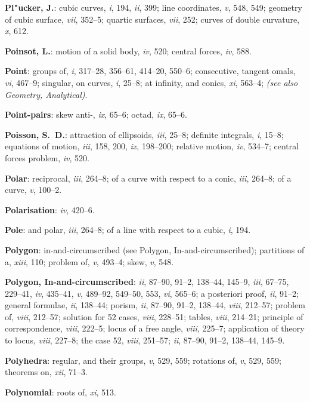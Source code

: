 \documentclass[11pt,a4paper]{article}
\newcommand{\IndexEntry}[1]{\textbf{#1}}
\newcommand{\SeeAlso}[1]{\textit{(see also #1)}}
\newcommand{\V}[1]{\textit{#1}} %
\begin{document}
\IndexEntry{Pl"ucker, J.}: cubic curves, \V{i}, 194, \V{ii}, 399; line coordinates, \V{v}, 548, 549; geometry of cubic surface, \V{vii}, 352--5; quartic surfaces, \V{vii}, 252; curves of double curvature, \V{x}, 612.

\IndexEntry{Poinsot, L.}: motion of a solid body, \V{iv}, 520; central forces, \V{iv}, 588.

\IndexEntry{Point}: groups of, \V{i}, 317--28, 356--61, 414--20, 550--6; consecutive, tangent omals, \V{vi}, 467--9; singular, on curves, \V{i}, 25--8; at infinity, and conics, \V{xi}, 563--4; \SeeAlso{Geometry, Analytical}.

\IndexEntry{Point-pairs}: skew anti-, \V{ix}, 65--6; octad, \V{ix}, 65--6.

\IndexEntry{Poisson, S.\ D.}: attraction of ellipsoids, \V{iii}, 25--8; definite integrals, \V{i}, 15--8; equations of motion, \V{iii}, 158, 200, \V{ix}, 198--200; relative motion, \V{iv}, 534--7; central forces problem, \V{iv}, 520.

\IndexEntry{Polar}: reciprocal, \V{iii}, 264--8; of a curve with respect to a conic, \V{iii}, 264--8; of a curve, \V{v}, 100--2.

\IndexEntry{Polarisation}: \V{iv}, 420--6.

\IndexEntry{Pole}: and polar, \V{iii}, 264--8; of a line with respect to a cubic, \V{i}, 194.

\IndexEntry{Polygon}: in-and-circumscribed (see Polygon, In-and-circumscribed); partitions of a, \V{xiii}, 110; problem of, \V{v}, 493--4; skew, \V{v}, 548.

\IndexEntry{Polygon, In-and-circumscribed}: \V{ii}, 87--90, 91--2, 138--44, 145--9, \V{iii}, 67--75, 229--41, \V{iv}, 435--41, \V{v}, 489--92, 549--50, 553, \V{vi}, 565--6; a posteriori proof, \V{ii}, 91--2; general formulae, \V{ii}, 138--44; porism, \V{ii}, 87--90, 91--2, 138--44, \V{viii}, 212--57; problem of, \V{viii}, 212--57; solution for 52 cases, \V{viii}, 228--51; tables, \V{viii}, 214--21; principle of correspondence, \V{viii}, 222--5; locus of a free angle, \V{viii}, 225--7; application of theory to locus, \V{viii}, 227--8; the case 52, \V{viii}, 251--57; \V{ii}, 87--90, 91--2, 138--44, 145--9.

\IndexEntry{Polyhedra}: regular, and their groups, \V{v}, 529, 559; rotations of, \V{v}, 529, 559; theorems on, \V{xii}, 71--3.

\IndexEntry{Polynomial}: roots of, \V{xi}, 513.

\newpage
\end{document}
